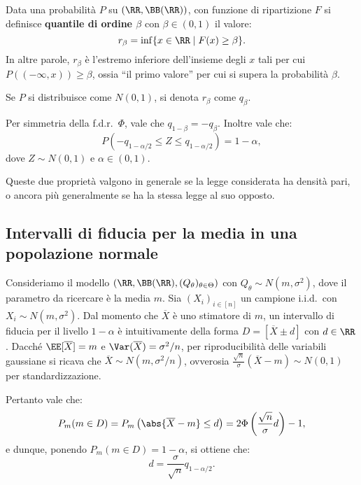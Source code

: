 \begin{multicols*}{2}
\begin{definition}
    Data una probabilità $P$ su $(\RR, \BB(\RR))$, con funzione di ripartizione $F$ si
    definisce \textbf{quantile di ordine $\beta$} con $\beta \in (0, 1)$ il valore:
    \[ 
        r_\beta = \inf \{ x \in \RR \mid F(x) \geq \beta \}.
    \]
    In altre parole, $r_\beta$ è l'estremo inferiore dell'insieme degli $x$ tali per cui
    $P((-\infty, x)) \geq \beta$, ossia ``il primo valore'' per cui si supera la probabilità
    $\beta$. \smallskip


    Se $P$ si distribuisce come $N(0, 1)$, si denota $r_\beta$ come $q_\beta$.
\end{definition}

\begin{remark}
    Per simmetria della f.d.r.~$\Phi$, vale che $q_{1-\beta} = -q_\beta$. Inoltre vale che:
    \[
        P(-q_{1-\alpha/2} \leq Z \leq q_{1-\alpha/2}) = 1-\alpha,
    \]
    dove $Z \sim N(0, 1)$ e $\alpha \in (0, 1)$. \smallskip

    Queste due proprietà valgono in generale se la legge considerata ha densità pari, o ancora
    più generalmente se ha la stessa legge al suo opposto.
\end{remark}

\subsection{Intervalli di fiducia per la media in una popolazione normale}

Consideriamo il modello $(\RR, \BB(\RR), (Q_\theta)_{\theta \in \Theta})$ con $Q_\theta \sim N(m, \sigma^2)$, dove il
parametro da ricercare è la media $m$. Sia $(X_i)_{i \in [n]}$ un campione i.i.d.~con $X_i \sim N(m, \sigma^2)$.
Dal momento che $\overline{X}$ è uno stimatore
di $m$, un intervallo di fiducia per il livello $1-\alpha$ è intuitivamente della forma $D = [\overline{X} \pm d]$ con $d \in \RR$.
Dacché $\EE[\overline{X}] = m$ e $\Var(\overline{X}) = \sigma^2/n$, per riproducibilità delle variabili gaussiane si
ricava che $\overline{X} \sim N(m, \sigma^2/n)$, ovverosia $\frac{\sqrt{n}}{\sigma}(\overline{X} - m) \sim N(0, 1)$ per
standardizzazione. \smallskip

Pertanto vale che:
\[ P_m(m \in D) = P_m\left(\abs{\overline{X} - m} \leq d\right) = 2 \Phi\left(\frac{\sqrt{n}}{\sigma} d\right) - 1, \]
e dunque, ponendo $P_m(m \in D) = 1-\alpha$, si ottiene che:
\[
    d = \frac{\sigma}{\sqrt{n}} q_{1-\alpha/2}.
\]

\end{multicols*}
